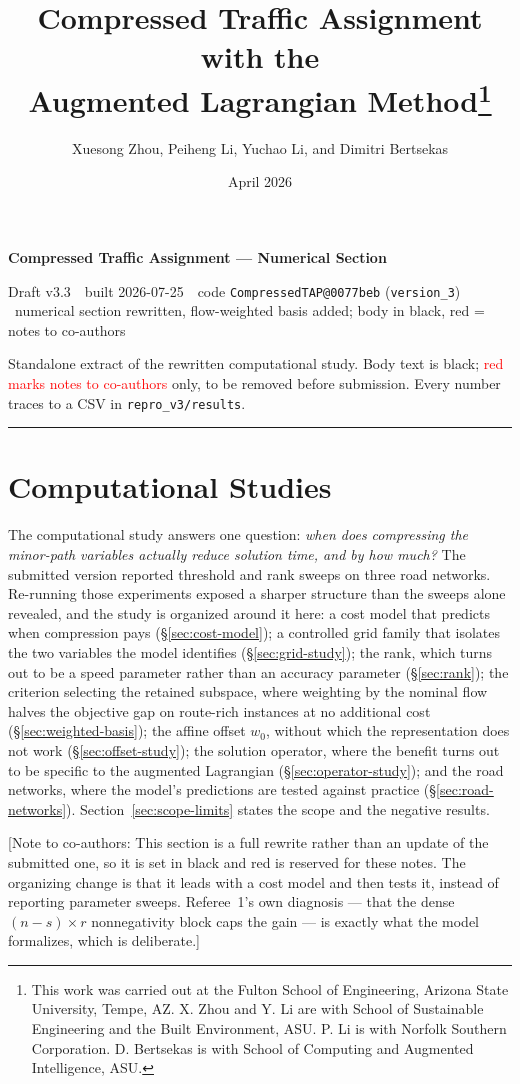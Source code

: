 \documentclass[11pt]{article}
\title{Compressed Traffic Assignment with the \\Augmented Lagrangian Method\footnote{
This work was carried out at the Fulton School of Engineering, Arizona State University, Tempe, AZ. X. Zhou and Y. Li are with School of Sustainable Engineering and the Built Environment, ASU. P. Li is with Norfolk Southern Corporation. D. Bertsekas is with School of Computing and Augmented Intelligence, ASU.}}
\author{Xuesong Zhou, Peiheng Li, Yuchao Li, and Dimitri Bertsekas}
\date{April 2026}
\makeatletter
\newcommand{\docver}{v3.3}
\newcommand{\docdate}{2026-07-25}
\newcommand{\doccommit}{0077beb}
\newcommand{\docstamp}{Draft \docver\ \textbullet\ built \docdate\ \textbullet\ code
  \texttt{CompressedTAP@\doccommit} (\texttt{version\_3}) \textbullet\ numerical section
  rewritten, flow-weighted basis added; body in black, red = notes to co-authors}
\newcommand{\conote}[1]{{\color{red}\small\textsf{[Note to co-authors: #1]}}}
\makeatother
\begin{document}
{\Large\bfseries Compressed Traffic Assignment --- Numerical Section}\par
\vspace{3pt}
{\small\textsf{\docstamp}}\par
\vspace{3pt}
{\small Standalone extract of the rewritten computational study. Body text is black;
\textcolor{red}{red marks notes to co-authors} only, to be removed before submission.
Every number traces to a CSV in \texttt{repro\_v3/results}.}
\vspace{8pt}\hrule\vspace{8pt}
\section{Computational Studies}
\label{sec:experiments}
\label{sec:experiments}\label{sec:computational}


The computational study answers one question: \emph{when does compressing the minor-path
variables actually reduce solution time, and by how much?} The submitted version reported
threshold and rank sweeps on three road networks. Re-running those experiments exposed a
sharper structure than the sweeps alone revealed, and the study is organized around it here:
a cost model that predicts when compression pays (\S\ref{sec:cost-model}); a controlled grid
family that isolates the two variables the model identifies (\S\ref{sec:grid-study}); the
rank, which turns out to be a speed parameter rather than an accuracy parameter
(\S\ref{sec:rank}); the criterion selecting the retained subspace, where weighting by the
nominal flow halves the objective gap on route-rich instances at no additional cost
(\S\ref{sec:weighted-basis}); the affine offset $w_0$, without which the representation does not work
(\S\ref{sec:offset-study}); the solution operator, where the benefit turns out to be specific
to the augmented Lagrangian (\S\ref{sec:operator-study}); and the road networks, where the
model's predictions are tested against practice (\S\ref{sec:road-networks}).
Section~\ref{sec:scope-limits} states the scope and the negative results.

\conote{This section is a full rewrite rather than an update of the submitted one, so it is
set in black and red is reserved for these notes. The organizing change is that it leads with
a cost model and then tests it, instead of reporting parameter sweeps. Referee~1's own
diagnosis --- that the dense $(n-s)\times r$ nonnegativity block caps the gain --- is exactly
what the model formalizes, which is deliberate.}
\end{document}
